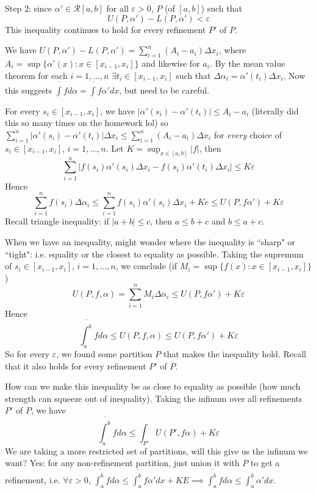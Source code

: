 \documentclass{article}
\theoremstyle{plain}
\theoremstyle{remark}
\newcommand{\ep}{{\varepsilon}}
\begin{document}
Step 2: since $\alpha' \in \mathcal{R}[a,b]$
for all $\ep > 0$, $P$ (of $[a,b]$) such that
\[
	U(P,\alpha') - L(P,\alpha') < \ep
\]
This inequality continues to hold for every refinement $P'$ of $P$.

We have $U(P,\alpha') - L(P,\alpha') = \sum_{i=1}^n(A_i - a_i)\Delta x_i$,
where $A_i = \sup\{\alpha'(x) \colon x \in [x_{i-1},x_i]\}$
and likewise for $a_i$.
By the mean value theorem for each $i = 1,\dots, n$
$\exists t_i \in [x_{i-1},x_i]$ such that
$\Delta \alpha_i = \alpha'(t_i)\Delta x_i$.
Now this suggests $\overline{\int}fd\alpha = \overline{\int}f\alpha'dx$,
but need to be careful.

For every $s_i \in [x_{i-1},x_i]$, we have
$|\alpha'(s_i) - \alpha'(t_i)| \leq A_i - a_i$
(literally did this so many times on the homework lol)
so $\sum_{i=1}^n |\alpha'(s_i) - \alpha'(t_i)|\Delta x_i
\leq \sum_{i=1}^n (A_i - a_i)\Delta x_i$
for \emph{every} choice of $s_i \in [x_{i-1},x_i]$, $i = 1,\dots,n$.
Let $K = \sup_{x \in [a,b]}|f|$, then
\begin{equation}\label{6.17 ineq}
	\sum_{i=1}^n |f(s_i)\alpha'(s_i)\Delta x_i - f(s_i)\alpha'(t_i)\Delta x_i|
	\leq K\ep
\end{equation}
Hence
\[
	\sum_{i=1}^n f(s_i)\Delta \alpha_i \leq \sum_{i=1}^n f(s_i)\alpha'(s_i)\Delta x_i + Ke
	\leq U(P,f\alpha') + K\ep
\]
Recall triangle inequality:
if $|a+b| \leq c$, then $a \leq b + c$ and $b \leq a + c$.

When we have an inequality, might wonder where the inequality is
``sharp" or ``tight":
i.e. equality or the closest to equality as possible.
Taking the supremum of $s_i \in [x_{i-1},x_i]$, $i = 1, \dots, n$,
we conclude (if $M_i = \sup\{f(x) \colon x \in [x_{i-1},x_i]\}$)
\[
	U(P,f,\alpha) = \sum_{i=1}^n M_i \Delta \alpha_i \leq U(P,f\alpha') + K\ep
\]
Hence
\[
	\overline{\int_a^b}fd\alpha \leq U(P,f,\alpha) \leq U(P,f\alpha') + K\ep
\]
So for every $\ep$, we found some partition $P$ that makes the inequality hold.
Recall that it also holds for every refinement $P'$ of $P$.

How can we make this inequality be as close to equality as possible
(how much strength can squeeze out of inequality).
Taking the infinum over all refinements $P'$ of $P$, we have
\[
	\overline{\int_a^b}fd\alpha \leq \int_{P'} U(P',f\alpha) + K\ep
\]
We are taking a more restricted set of partitions,
will this give us the infinum we want?
Yes: for any non-refinement partition,
just union it with $P$ to get a refinement,
i.e. $\forall \ep > 0$, $\overline{\int_a^b}fd\alpha \leq \overline{\int_a^b}f\alpha'dx + KE
\implies \overline{\int_{a}^b} fd\alpha \leq \int_a^b \alpha'dx$.
\end{document}
